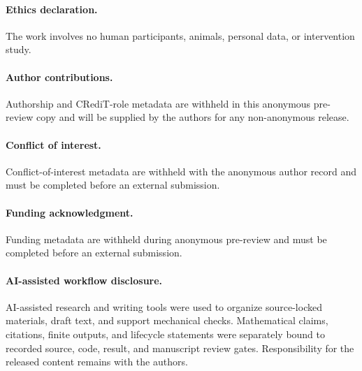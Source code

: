 \documentclass[11pt]{article}
\theoremstyle{definition}
\theoremstyle{remark}
\begin{document}
\paragraph{Ethics declaration.}
The work involves no human participants, animals, personal data, or
intervention study.

\paragraph{Author contributions.}
Authorship and CRediT-role metadata are withheld in this anonymous pre-review
copy and will be supplied by the authors for any non-anonymous release.

\paragraph{Conflict of interest.}
Conflict-of-interest metadata are withheld with the anonymous author record
and must be completed before an external submission.

\paragraph{Funding acknowledgment.}
Funding metadata are withheld during anonymous pre-review and must be
completed before an external submission.

\paragraph{AI-assisted workflow disclosure.}
AI-assisted research and writing tools were used to organize source-locked
materials, draft text, and support mechanical checks.  Mathematical claims,
citations, finite outputs, and lifecycle statements were separately bound to
recorded source, code, result, and manuscript review gates.  Responsibility
for the released content remains with the authors.



\end{document}
